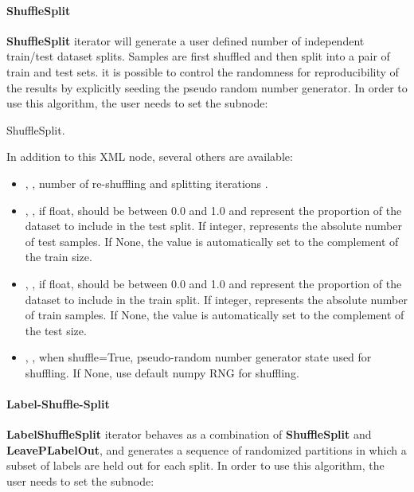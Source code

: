 \paragraph{ShuffleSplit}
\textbf{ShuffleSplit} iterator will generate a user defined number of independent train/test dataset splits. Samples
are first shuffled and then split into a pair of train and test sets. it is possible to control the randomness for
reproducibility of the results by explicitly seeding the  pseudo random number generator.
In order to use this algorithm, the user needs to set the subnode:

ShuffleSplit.

In addition to this XML node, several others are available:
\begin{itemize}
  \item {}, , number of re-shuffling and splitting iterations
    .
  \item {}, , if float, should be between 0.0 and 1.0 and
    represent the proportion of the dataset to include in the test split. 
    If integer, represents the absolute number of test samples. If None, the value is automatically set to
    the complement of the train size.
  \item {}, , if float, should be between 0.0 and 1.0 and represent
    the proportion of the dataset to include in the train split. If integer, represents the absolute number of train
    samples. If None, the value is automatically set to the complement of the test size. 
  \item {}, , when shuffle=True,
    pseudo-random number generator state used for shuffling. If None, use default numpy RNG for shuffling.
\end{itemize}

\paragraph{Label-Shuffle-Split}
\textbf{LabelShuffleSplit} iterator behaves as a combination of \textbf{ShuffleSplit} and \textbf{LeavePLabelOut},
and generates a sequence of randomized partitions in which a subset of labels are held out for each split.
In order to use this algorithm, the user needs to set the subnode:

